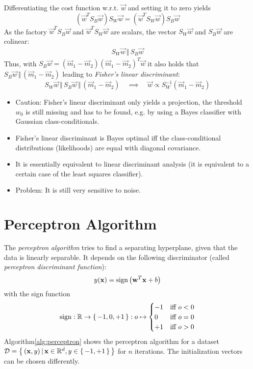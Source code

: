 				Differentiating the cost function w.r.t. \(\vec{w}\) and setting it to zero yields
				\begin{equation}
					(\vec{w}^T S_B \vec{w}) S_W \vec{w} = (\vec{w}^T S_W \vec{w}) S_B \vec{w}
				\end{equation}
				As the factory \( \vec{w}^T S_B \vec{w} \) and \( \vec{w}^T S_W \vec{w} \) are scalars, the vector \( S_W \vec{w} \) and \( S_B \vec{w} \) are colinear:
				\begin{eqnarray}
					S_W \vec{w} \,\Vert\, S_B \vec{w}
				\end{eqnarray}
				Thus, with \( S_B \vec{w} = (\vec{m}_1 - \vec{m}_2) (\vec{m}_1 - \vec{m}_2)^T \vec{w} \) it also holds that \( S_B \vec{w} \,\Vert\, (\vec{m}_1 - \vec{m}_2) \) leading to \emph{Fisher's linear discriminant}:
				\begin{equation}
					S_W \vec{w} \,\Vert\, S_B \vec{w} \,\Vert\, (\vec{m}_1 - \vec{m}_2) \quad\implies\quad \vec{w} \propto S_W^{-1} (\vec{m}_1 - \vec{m}_2)
				\end{equation}
				
				\begin{itemize}
					\item Caution: Fisher's linear discriminant only yields a projection, the threshold \(w_0\) is still missing and has to be found, e.g. by using a Bayes classifier with Gaussian class-conditionals.
					\item Fisher's linear discriminant is Bayes optimal iff the class-conditional distributions (likelihoods) are equal with diagonal covariance.
					\item It is essentially equivalent to linear discriminant analysis (it is equivalent to a certain case of the least squares classifier).
					\item Problem: It is still very sensitive to noise.
				\end{itemize}

	\section{Perceptron Algorithm} %
		The \emph{perceptron algorithm} tries to find a separating hyperplane, given that the data is linearly separable. It depends on the following discriminator (called \emph{perceptron discriminant function}):
		\begin{equation}
			y(\boldsymbol{\mathrm{x}}) = \operatorname{sign}\big(\boldsymbol{\mathrm{w}}^T \boldsymbol{\mathrm{x}} + b\big)
		\end{equation}
		with the sign function
		\begin{equation}
			\operatorname{sign} : \mathbb{R} \to \{\, -1, 0, +1 \,\} : o \mapsto
				\begin{cases}
					-1 & \textrm{iff } o < 0 \\
					 0 & \textrm{iff } o = 0 \\
					+1 & \textrm{iff } o > 0
				\end{cases}
		\end{equation}
		Algorithm\ref{alg:perceptron} shows the perceptron algorithm for a dataset \( \mathcal{D} = \big\{\, (\boldsymbol{\mathrm{x}}, y) \,\vert\, \boldsymbol{\mathrm{x}} \in \mathbb{R}^d, y \in \{\, -1, +1 \,\} \,\big\} \) for \(n\) iterations. The initialization vectors can be chosen differently.


